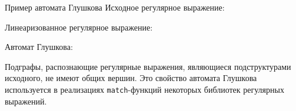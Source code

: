 \begin{frame}{Пример автомата Глушкова}
  Исходное регулярное выражение:


  Линеаризованное регулярное выражение:

  Автомат Глушкова:


  Подграфы, распознающие регулярные выражения, являющиеся подструктурами исходного, не имеют общих вершин. Это свойство автомата Глушкова используется в реализациях \texttt{match}-функций некоторых библиотек регулярных выражений. %
\end{frame}